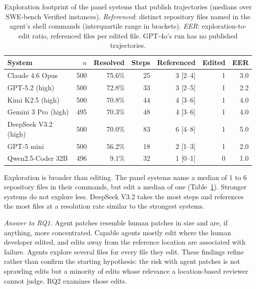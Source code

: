 \documentclass[a4paper,fleqn]{cas-sc}
\newcommand{\rqoneExploreRefMax}{6}
\newcommand{\rqoneExploreRefMin}{1}
\begin{document}
\begin{table}[t]
\caption{Exploration footprint of the panel systems that publish trajectories (medians over SWE-bench Verified instances). \emph{Referenced}: distinct repository files named in the agent's shell commands (interquartile range in brackets). \emph{EER}: exploration-to-edit ratio, referenced files per edited file. GPT-4o's run has no published trajectories.}
\label{tab:explore}
\centering\footnotesize
\begin{tabular}{lrrrrrr}
\toprule
System & $n$ & Resolved & Steps & Referenced & Edited & EER \\
\midrule
Claude 4.6 Opus & 500 & 75.6\% & 25 & 3 [2--4] & 1 & 3.0 \\
GPT-5.2 (high) & 500 & 72.8\% & 33 & 3 [2--5] & 1 & 2.2 \\
Kimi K2.5 (high) & 500 & 70.8\% & 44 & 4 [3--6] & 1 & 4.0 \\
Gemini 3 Pro (high) & 495 & 70.3\% & 48 & 4 [3--6] & 1 & 4.0 \\
DeepSeek V3.2 (high) & 500 & 70.0\% & 83 & 6 [4--8] & 1 & 5.0 \\
GPT-5 mini & 500 & 56.2\% & 18 & 2 [1--3] & 1 & 2.0 \\
Qwen2.5-Coder 32B & 496 & 9.1\% & 32 & 1 [0--1] & 0 & 1.0 \\
\bottomrule
\end{tabular}
\end{table}

Exploration is broader than editing. The panel systems name a median of \rqoneExploreRefMin{} to \rqoneExploreRefMax{} repository files in their commands, but edit a median of one (Table~\ref{tab:explore}). Stronger systems do not explore less. DeepSeek V3.2 takes the most steps and references the most files at a resolution rate similar to the strongest systems.

\emph{Answer to RQ1.} Agent patches resemble human patches in size and are, if anything, more concentrated. Capable agents mostly edit where the human developer edited, and edits away from the reference location are associated with failure. Agents explore several files for every file they edit. These findings refine rather than confirm the starting hypothesis: the risk with agent patches is not sprawling edits but a minority of edits whose relevance a location-based reviewer cannot judge. RQ2 examines those edits.
\end{document}
